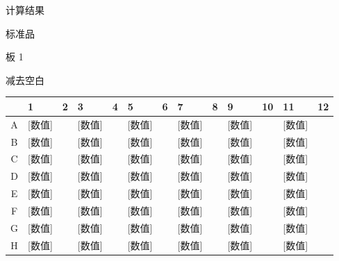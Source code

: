 \documentclass[UTF8,10pt,a4paper,fontset=fandol]{ctexart}
\begin{document}
\vspace{0.5em}

\noindent
计算结果

\noindent
标准品

\noindent
板 1

\noindent
减去空白

\vspace{0.5em}

\begin{center}
\scriptsize
\begin{tabular}{|c|p{0.48cm}|p{0.48cm}|p{0.48cm}|p{0.48cm}|p{0.48cm}|p{0.48cm}|p{0.48cm}|p{0.48cm}|p{0.48cm}|p{0.48cm}|p{0.48cm}|p{0.48cm}|}
\hline
 & 1 & 2 & 3 & 4 & 5 & 6 & 7 & 8 & 9 & 10 & 11 & 12 \\ \hline
A &
\scriptsize [数值] & & \scriptsize [数值] & & \scriptsize [数值] & & \scriptsize [数值] & & \scriptsize [数值] & & \scriptsize [数值] & \\ \hline
B &
\scriptsize [数值] & & \scriptsize [数值] & & \scriptsize [数值] & & \scriptsize [数值] & & \scriptsize [数值] & & \scriptsize [数值] & \\ \hline
C &
\scriptsize [数值] & & \scriptsize [数值] & & \scriptsize [数值] & & \scriptsize [数值] & & \scriptsize [数值] & & \scriptsize [数值] & \\ \hline
D &
\scriptsize [数值] & & \scriptsize [数值] & & \scriptsize [数值] & & \scriptsize [数值] & & \scriptsize [数值] & & \scriptsize [数值] & \\ \hline
E &
\scriptsize [数值] & & \scriptsize [数值] & & \scriptsize [数值] & & \scriptsize [数值] & & \scriptsize [数值] & & \scriptsize [数值] & \\ \hline
F &
\scriptsize [数值] & & \scriptsize [数值] & & \scriptsize [数值] & & \scriptsize [数值] & & \scriptsize [数值] & & \scriptsize [数值] & \\ \hline
G &
\scriptsize [数值] & & \scriptsize [数值] & & \scriptsize [数值] & & \scriptsize [数值] & & \scriptsize [数值] & & \scriptsize [数值] & \\ \hline
H &
\scriptsize [数值] & & \scriptsize [数值] & & \scriptsize [数值] & & \scriptsize [数值] & & \scriptsize [数值] & & \scriptsize [数值] & \\ \hline
\end{tabular}
\end{center}

\end{document}
